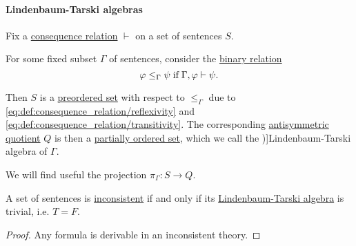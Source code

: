 \paragraph{Lindenbaum-Tarski algebras}

\begin{definition}\label{def:lindenbaum_tarski_algebra}
  Fix a \hyperref[def:consequence_relation]{consequence relation} \( {\vdash} \) on a set of sentences \( S \).

  For some fixed subset \( \Gamma \) of sentences, consider the \hyperref[def:binary_relation]{binary relation}
  \begin{equation*}
    \varphi \leq_\Gamma \psi \T{if} \Gamma, \varphi \vdash \psi.
  \end{equation*}

  Then \( S \) is a \hyperref[def:preordered_set]{preordered set} with respect to \( \leq_\Gamma \) due to \eqref{eq:def:consequence_relation/reflexivity} and \eqref{eq:def:consequence_relation/transitivity}. The corresponding \hyperref[def:antisymmetric_quotient]{antisymmetric quotient} \( Q \) is then a \hyperref[def:partially_ordered_set]{partially ordered set}, which we call the \term[ru=алгебра Линденбаума-Тарского, en=Lindenbaum-Tarski algebra (\cite[def. 6.3.1]{CitkinMuravitsky2022ConsequenceRelations})]{Lindenbaum-Tarski algebra} of \( \Gamma \).
\end{definition}
\begin{comments}
  \item We will find useful the projection \( \pi_\Gamma: S \to Q \).
\end{comments}

\begin{proposition}\label{thm:inconsistent_lindenbaum_tarski_algebra}
  A set of sentences is \hyperref[def:consistent_set_of_sentences]{inconsistent} if and only if its \hyperref[def:lindenbaum_tarski_algebra]{Lindenbaum-Tarski algebra} is trivial, i.e. \( T = F \).
\end{proposition}
\begin{proof}
  Any formula is derivable in an inconsistent theory.
\end{proof}

